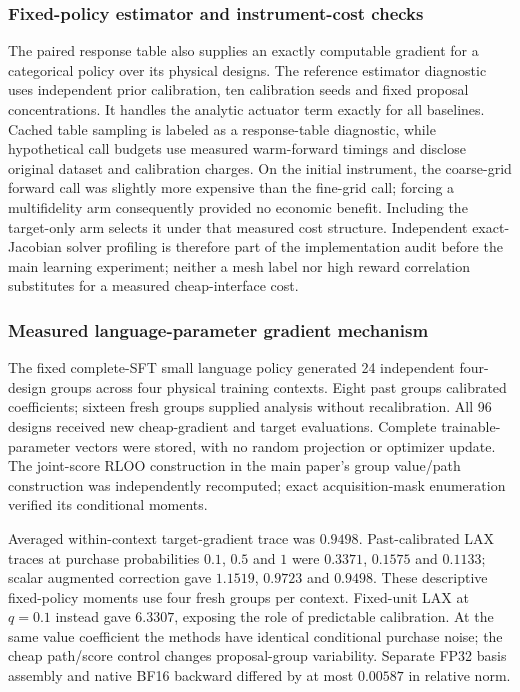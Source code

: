 \subsubsection{Fixed-policy estimator and instrument-cost checks}
The paired response table also supplies an exactly computable gradient for a categorical policy over its physical designs. The reference estimator diagnostic uses independent prior calibration, ten calibration seeds and fixed proposal concentrations. It handles the analytic actuator term exactly for all baselines. Cached table sampling is labeled as a response-table diagnostic, while hypothetical call budgets use measured warm-forward timings and disclose original dataset and calibration charges. On the initial instrument, the coarse-grid forward call was slightly more expensive than the fine-grid call; forcing a multifidelity arm consequently provided no economic benefit. Including the target-only arm selects it under that measured cost structure. Independent exact-Jacobian solver profiling is therefore part of the implementation audit before the main learning experiment; neither a mesh label nor high reward correlation substitutes for a measured cheap-interface cost.

\subsubsection{Measured language-parameter gradient mechanism}
The fixed complete-SFT small language policy generated 24 independent four-design groups across four physical training contexts. Eight past groups calibrated coefficients; sixteen fresh groups supplied analysis without recalibration. All 96 designs received new cheap-gradient and target evaluations. Complete trainable-parameter vectors were stored, with no random projection or optimizer update. The joint-score RLOO construction in the main paper's group value/path construction was independently recomputed; exact acquisition-mask enumeration verified its conditional moments.

Averaged within-context target-gradient trace was $0.9498$. Past-calibrated LAX traces at purchase probabilities $0.1$, $0.5$ and $1$ were $0.3371$, $0.1575$ and $0.1133$; scalar augmented correction gave $1.1519$, $0.9723$ and $0.9498$. These descriptive fixed-policy moments use four fresh groups per context. Fixed-unit LAX at $q=0.1$ instead gave $6.3307$, exposing the role of predictable calibration. At the same value coefficient the methods have identical conditional purchase noise; the cheap path/score control changes proposal-group variability. Separate FP32 basis assembly and native BF16 backward differed by at most $0.00587$ in relative norm.


